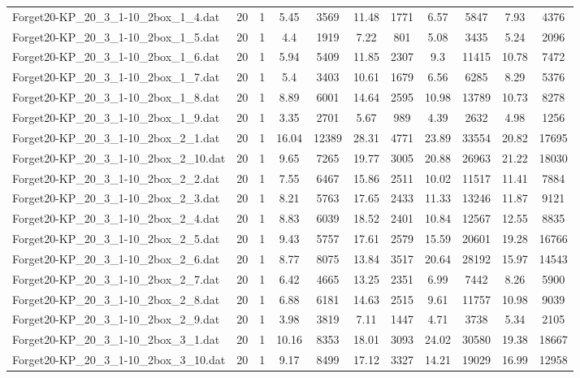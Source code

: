 \begin{table}[!ht]
\begin{tabular}{lcccccccccc}
Forget20-KP\_20\_3\_1-10\_2box\_1\_4.dat & 20 & 1 & 5.45 & 3569 & 11.48 & 1771 & 6.57 & 5847 & 7.93 & 4376 \\
Forget20-KP\_20\_3\_1-10\_2box\_1\_5.dat & 20 & 1 & 4.4 & 1919 & 7.22 & 801 & 5.08 & 3435 & 5.24 & 2096 \\
Forget20-KP\_20\_3\_1-10\_2box\_1\_6.dat & 20 & 1 & 5.94 & 5409 & 11.85 & 2307 & 9.3 & 11415 & 10.78 & 7472 \\
Forget20-KP\_20\_3\_1-10\_2box\_1\_7.dat & 20 & 1 & 5.4 & 3403 & 10.61 & 1679 & 6.56 & 6285 & 8.29 & 5376 \\
Forget20-KP\_20\_3\_1-10\_2box\_1\_8.dat & 20 & 1 & 8.89 & 6001 & 14.64 & 2595 & 10.98 & 13789 & 10.73 & 8278 \\
Forget20-KP\_20\_3\_1-10\_2box\_1\_9.dat & 20 & 1 & 3.35 & 2701 & 5.67 & 989 & 4.39 & 2632 & 4.98 & 1256 \\
Forget20-KP\_20\_3\_1-10\_2box\_2\_1.dat & 20 & 1 & 16.04 & 12389 & 28.31 & 4771 & 23.89 & 33554 & 20.82 & 17695 \\
Forget20-KP\_20\_3\_1-10\_2box\_2\_10.dat & 20 & 1 & 9.65 & 7265 & 19.77 & 3005 & 20.88 & 26963 & 21.22 & 18030 \\
Forget20-KP\_20\_3\_1-10\_2box\_2\_2.dat & 20 & 1 & 7.55 & 6467 & 15.86 & 2511 & 10.02 & 11517 & 11.41 & 7884 \\
Forget20-KP\_20\_3\_1-10\_2box\_2\_3.dat & 20 & 1 & 8.21 & 5763 & 17.65 & 2433 & 11.33 & 13246 & 11.87 & 9121 \\
Forget20-KP\_20\_3\_1-10\_2box\_2\_4.dat & 20 & 1 & 8.83 & 6039 & 18.52 & 2401 & 10.84 & 12567 & 12.55 & 8835 \\
Forget20-KP\_20\_3\_1-10\_2box\_2\_5.dat & 20 & 1 & 9.43 & 5757 & 17.61 & 2579 & 15.59 & 20601 & 19.28 & 16766 \\
Forget20-KP\_20\_3\_1-10\_2box\_2\_6.dat & 20 & 1 & 8.77 & 8075 & 13.84 & 3517 & 20.64 & 28192 & 15.97 & 14543 \\
Forget20-KP\_20\_3\_1-10\_2box\_2\_7.dat & 20 & 1 & 6.42 & 4665 & 13.25 & 2351 & 6.99 & 7442 & 8.26 & 5900 \\
Forget20-KP\_20\_3\_1-10\_2box\_2\_8.dat & 20 & 1 & 6.88 & 6181 & 14.63 & 2515 & 9.61 & 11757 & 10.98 & 9039 \\
Forget20-KP\_20\_3\_1-10\_2box\_2\_9.dat & 20 & 1 & 3.98 & 3819 & 7.11 & 1447 & 4.71 & 3738 & 5.34 & 2105 \\
Forget20-KP\_20\_3\_1-10\_2box\_3\_1.dat & 20 & 1 & 10.16 & 8353 & 18.01 & 3093 & 24.02 & 30580 & 19.38 & 18667 \\
Forget20-KP\_20\_3\_1-10\_2box\_3\_10.dat & 20 & 1 & 9.17 & 8499 & 17.12 & 3327 & 14.21 & 19029 & 16.99 & 12958 \\

\end{tabular}
\end{table}

